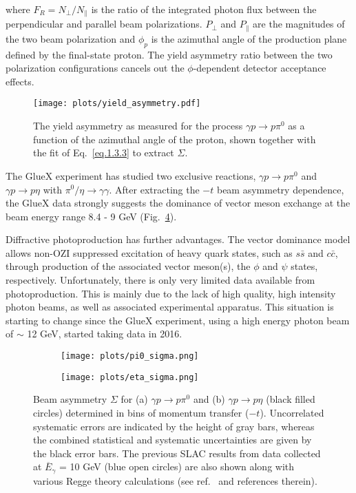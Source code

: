 \noindent where $F_{R} = N_{\perp}/N_{\parallel}$ is the ratio of the integrated photon flux between the perpendicular and parallel beam polarizations. $P_{\perp}$ and $P_{\parallel}$ are the magnitudes of the two beam polarization and $\phi_{p}$ is the azimuthal angle of the production plane defined by the final-state proton. The yield asymmetry ratio between the two polarization configurations cancels out the $\phi$-dependent detector acceptance effects.

\begin{figure}[H]
    \centering
        \texttt{[image: plots/yield\_asymmetry.pdf]}
        \caption{The yield asymmetry as measured for the process $\gamma p \rightarrow p \pi^{0}$ as a function of the azimuthal angle of the proton, shown together with the fit of Eq.~\ref{eq.1.3.3} to extract $\Sigma$.}
    \label{fig.1.3.3.2}
\end{figure}

The GlueX experiment has studied two exclusive reactions, $\gamma p \rightarrow p \pi^{0}$ and $\gamma p \rightarrow p \eta$ with $\pi^{0}/\eta\rightarrow \gamma\gamma$. After extracting the $-t$ beam asymmetry dependence, the GlueX data strongly suggests the dominance of vector meson exchange at the beam energy range 8.4 - 9 GeV (Fig.~\ref{fig.1.3.3.3}).
~\par Diffractive photoproduction has further advantages. The vector dominance model allows non-OZI suppressed excitation of heavy quark states, such as $s\bar{s}$ and $c\bar{c}$, through production of the associated vector meson(s), the $\phi$ and $\psi$ states, respectively. Unfortunately, there is only very limited data available from photoproduction. This is mainly due to the lack of high quality, high intensity photon beams, as well as associated experimental apparatus. This situation is starting to change since the GlueX experiment, using a high energy photon beam of $\sim$ 12 GeV, started taking data in 2016.

\begin{figure}[H]
    \centering
    \begin{subfigure}[b]{0.65\textwidth}
        \texttt{[image: plots/pi0\_sigma.png]}
        \caption{}
        \label{fig.1.3.3.3.a}
    \end{subfigure}\hfill
    \begin{subfigure}[b]{0.65\textwidth}
        \texttt{[image: plots/eta\_sigma.png]}
        \caption{}
        \label{fig.1.3.3.3.b}
    \end{subfigure}
    \caption{ Beam asymmetry $\Sigma$ for (a) $\gamma p \rightarrow p \pi^{0}$ and (b) $\gamma p \rightarrow p \eta$ (black filled circles) determined in bins of momentum transfer ($-t$). Uncorrelated systematic errors are indicated by the height of gray bars, whereas the combined statistical and systematic uncertainties are given by the black error bars. The previous SLAC results from data collected at $\overline{{E}}_{\gamma}$ = 10 GeV (blue open circles) are also shown along with various Regge theory calculations (see ref.~\cite{Ghoul17} and references therein).}
    \label{fig.1.3.3.3}
\end{figure}

